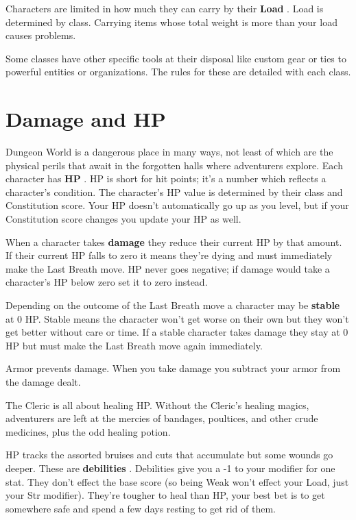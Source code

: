  

Characters are limited in how much they can carry by their {\bf Load} . Load is determined by class. Carrying items whose total weight is more than your load causes problems.

 

Some classes have other specific tools at their disposal like custom gear or ties to powerful entities or organizations. The rules for these are detailed with each class.

 
\section{Damage and HP}    
 

Dungeon World is a dangerous place in many ways, not least of which are the physical perils that await in the forgotten halls where adventurers explore. Each character has {\bf HP} . HP is short for hit points; it's a number which reflects a character's condition. The character's HP value is determined by their class and Constitution score. Your HP doesn't automatically go up as you level, but if your Constitution score changes you update your HP as well.

 

When a character takes {\bf damage}  they reduce their current HP by that amount. If their current HP falls to zero it means they're dying and must immediately make the Last Breath move. HP never goes negative; if damage would take a character's HP below zero set it to zero instead.

 

Depending on the outcome of the Last Breath move a character may be {\bf stable}  at 0 HP. Stable means the character won't get worse on their own but they won't get better without care or time. If a stable character takes damage they stay at 0 HP but must make the Last Breath move again immediately.

 

Armor prevents damage. When you take damage you subtract your armor from the damage dealt.

 

The Cleric is all about healing HP. Without the Cleric's healing magics, adventurers are left at the mercies of bandages, poultices, and other crude medicines, plus the odd healing potion.

 

HP tracks the assorted bruises and cuts that accumulate but some wounds go deeper. These are {\bf debilities} . Debilities give you a -1 to your modifier for one stat. They don't effect the base score (so being Weak won't effect your Load, just your Str modifier). They're tougher to heal than HP, your best bet is to get somewhere safe and spend a few days resting to get rid of them.

